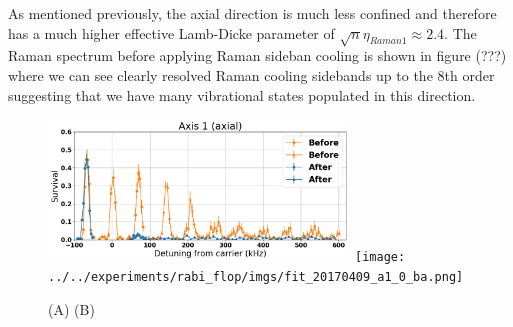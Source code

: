 \documentclass[aps,twocolumn,secnumarabic,balancelastpage,amsmath,amssymb,nofootinbib]{revtex4}
\begin{document}
As mentioned previously, the axial direction is much less confined and therefore has a much higher
effective Lamb-Dicke parameter of $\sqrt{n}\eta_{Raman1}\approx2.4$. The Raman spectrum before applying Raman sideban cooling is shown in figure (???) where we can see clearly resolved Raman cooling sidebands up to the 8th order suggesting that we have many vibrational states populated in this direction.

\begin{figure}
  \includegraphics[width=8cm]{imgs/spectrum_a1.png}
  \texttt{[image: ../../experiments/rabi\_flop/imgs/fit\_20170409\_a1\_0\_ba.png]}
  \caption{(A) (B)}
  \label{f-axial}
\end{figure}




\end{document}
